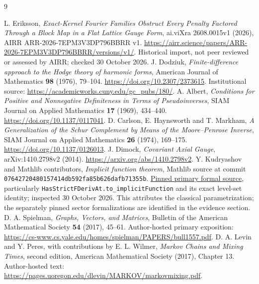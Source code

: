 \documentclass[11pt]{article}
\begin{document}
\begin{thebibliography}{9}
\raggedright
{} L. Eriksson, \emph{Exact-Kernel Fourier Families Obstruct
Every Penalty Factored Through a Block Map in a Flat Lattice Gauge Form},
ai.viXra 2608.0015v1 (2026), AIRR ARR-2026-7EPM3V3DP796BBRR v1.
\url{https://airr.science/papers/ARR-2026-7EPM3V3DP796BBRR/versions/v1/}.
Historical import, not peer reviewed or assessed by AIRR; checked 30 October 2026.
 J. Dodziuk, \emph{Finite-difference approach to the Hodge
theory of harmonic forms}, American Journal of Mathematics \textbf{98}
(1976), 79--104. \url{https://doi.org/10.2307/2373615}.
Institutional source: \url{https://academicworks.cuny.edu/gc_pubs/180/}.
 A. Albert, \emph{Conditions for Positive and Nonnegative
Definiteness in Terms of Pseudoinverses}, SIAM Journal on Applied Mathematics
\textbf{17} (1969), 434--440. \url{https://doi.org/10.1137/0117041}.
 D. Carlson, E. Haynsworth and T. Markham,
\emph{A Generalization of the Schur Complement by Means of the Moore--Penrose
Inverse}, SIAM Journal on Applied Mathematics \textbf{26} (1974), 169--175.
\url{https://doi.org/10.1137/0126013}.
 J. Dimock, \emph{Covariant Axial Gauge},
arXiv:1410.2798v2 (2014). \url{https://arxiv.org/abs/1410.2798v2}.
 Y. Kudryashov and Mathlib contributors,
\emph{Implicit function theorem}, Mathlib source at commit
\texttt{07642720480157414db592fa85b626dafb71355b}.
\href{https://github.com/leanprover-community/mathlib4/blob/07642720480157414db592fa85b626dafb71355b/Mathlib/Analysis/Calculus/Implicit.lean}{Pinned primary formal source},
particularly \texttt{HasStrictFDerivAt.to\_implicitFunction} and its exact
level-set identity; inspected 30 October 2026. This attributes the classical parametrization; the separately pinned sector formalizations are identified in the evidence section.
 D. A. Spielman, \emph{Graphs, Vectors, and Matrices},
Bulletin of the American Mathematical Society \textbf{54} (2017), 45--61.
Author-hosted primary exposition:
\url{https://cs-www.cs.yale.edu/homes/spielman/PAPERS/bull1557.pdf}.
 D. A. Levin and Y. Peres, with contributions by
E. L. Wilmer, \emph{Markov Chains and Mixing Times}, second edition,
American Mathematical Society (2017), Chapter 13.
Author-hosted text: \url{https://pages.uoregon.edu/dlevin/MARKOV/markovmixing.pdf}.
\end{thebibliography}
\end{document}
